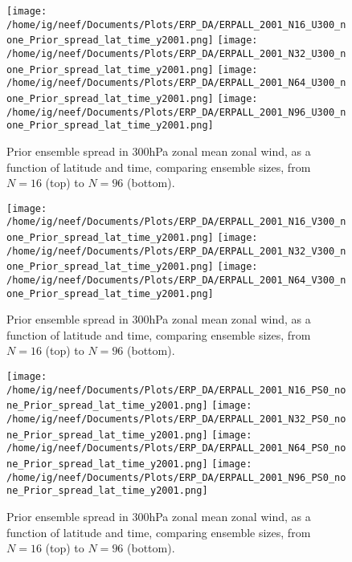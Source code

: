 \documentclass[11pt]{report}
\begin{document}
\begin{figure}
  \noindent
  \texttt{[image: /home/ig/neef/Documents/Plots/ERP\_DA/ERPALL\_2001\_N16\_U300\_none\_Prior\_spread\_lat\_time\_y2001.png]} 
  \texttt{[image: /home/ig/neef/Documents/Plots/ERP\_DA/ERPALL\_2001\_N32\_U300\_none\_Prior\_spread\_lat\_time\_y2001.png]} 
  \texttt{[image: /home/ig/neef/Documents/Plots/ERP\_DA/ERPALL\_2001\_N64\_U300\_none\_Prior\_spread\_lat\_time\_y2001.png]} 
  \texttt{[image: /home/ig/neef/Documents/Plots/ERP\_DA/ERPALL\_2001\_N96\_U300\_none\_Prior\_spread\_lat\_time\_y2001.png]} 
   \caption{Prior ensemble spread in 300hPa zonal mean zonal wind, as a function of latitude and time, comparing ensemble sizes, from $N=16$ (top) to $N=96$ (bottom). }
   \label{fig:U300_spread}
 \end{figure}

\begin{figure}
  \noindent
 \texttt{[image: /home/ig/neef/Documents/Plots/ERP\_DA/ERPALL\_2001\_N16\_V300\_none\_Prior\_spread\_lat\_time\_y2001.png]} 
  \texttt{[image: /home/ig/neef/Documents/Plots/ERP\_DA/ERPALL\_2001\_N32\_V300\_none\_Prior\_spread\_lat\_time\_y2001.png]} 
  \texttt{[image: /home/ig/neef/Documents/Plots/ERP\_DA/ERPALL\_2001\_N64\_V300\_none\_Prior\_spread\_lat\_time\_y2001.png]} 
   \caption{Prior ensemble spread in 300hPa zonal mean zonal wind, as a function of latitude and time, comparing ensemble sizes, from $N=16$ (top) to $N=96$ (bottom). }
   \label{fig:V300_spread}
 \end{figure}

\begin{figure}
  \noindent
  \texttt{[image: /home/ig/neef/Documents/Plots/ERP\_DA/ERPALL\_2001\_N16\_PS0\_none\_Prior\_spread\_lat\_time\_y2001.png]} 
  \texttt{[image: /home/ig/neef/Documents/Plots/ERP\_DA/ERPALL\_2001\_N32\_PS0\_none\_Prior\_spread\_lat\_time\_y2001.png]} 
  \texttt{[image: /home/ig/neef/Documents/Plots/ERP\_DA/ERPALL\_2001\_N64\_PS0\_none\_Prior\_spread\_lat\_time\_y2001.png]} 
  \texttt{[image: /home/ig/neef/Documents/Plots/ERP\_DA/ERPALL\_2001\_N96\_PS0\_none\_Prior\_spread\_lat\_time\_y2001.png]} 
   \caption{Prior ensemble spread in 300hPa zonal mean zonal wind, as a function of latitude and time, comparing ensemble sizes, from $N=16$ (top) to $N=96$ (bottom). }
   \label{fig:PS0_spread}
 \end{figure}
\end{document}
